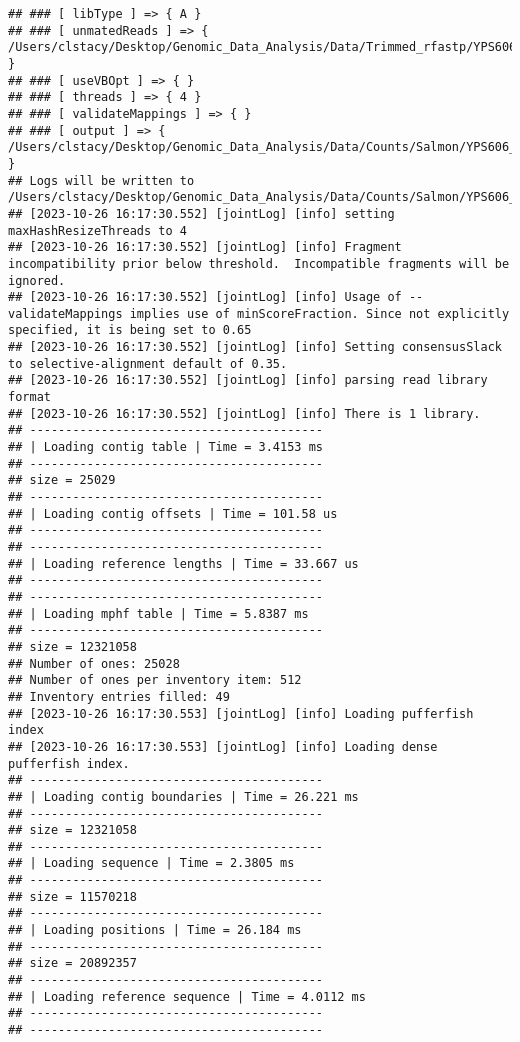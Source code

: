 \documentclass[
]{book}
\begin{document}
\begin{verbatim}
## ### [ libType ] => { A }
## ### [ unmatedReads ] => { /Users/clstacy/Desktop/Genomic_Data_Analysis/Data/Trimmed_rfastp/YPS606_WT_ETOH_REP2_R1.fastq.gz }
## ### [ useVBOpt ] => { }
## ### [ threads ] => { 4 }
## ### [ validateMappings ] => { }
## ### [ output ] => { /Users/clstacy/Desktop/Genomic_Data_Analysis/Data/Counts/Salmon/YPS606_WT_ETOH_REP2_R1.fastq.gz_quant }
## Logs will be written to /Users/clstacy/Desktop/Genomic_Data_Analysis/Data/Counts/Salmon/YPS606_WT_ETOH_REP2_R1.fastq.gz_quant/logs
## [2023-10-26 16:17:30.552] [jointLog] [info] setting maxHashResizeThreads to 4
## [2023-10-26 16:17:30.552] [jointLog] [info] Fragment incompatibility prior below threshold.  Incompatible fragments will be ignored.
## [2023-10-26 16:17:30.552] [jointLog] [info] Usage of --validateMappings implies use of minScoreFraction. Since not explicitly specified, it is being set to 0.65
## [2023-10-26 16:17:30.552] [jointLog] [info] Setting consensusSlack to selective-alignment default of 0.35.
## [2023-10-26 16:17:30.552] [jointLog] [info] parsing read library format
## [2023-10-26 16:17:30.552] [jointLog] [info] There is 1 library.
## -----------------------------------------
## | Loading contig table | Time = 3.4153 ms
## -----------------------------------------
## size = 25029
## -----------------------------------------
## | Loading contig offsets | Time = 101.58 us
## -----------------------------------------
## -----------------------------------------
## | Loading reference lengths | Time = 33.667 us
## -----------------------------------------
## -----------------------------------------
## | Loading mphf table | Time = 5.8387 ms
## -----------------------------------------
## size = 12321058
## Number of ones: 25028
## Number of ones per inventory item: 512
## Inventory entries filled: 49
## [2023-10-26 16:17:30.553] [jointLog] [info] Loading pufferfish index
## [2023-10-26 16:17:30.553] [jointLog] [info] Loading dense pufferfish index.
## -----------------------------------------
## | Loading contig boundaries | Time = 26.221 ms
## -----------------------------------------
## size = 12321058
## -----------------------------------------
## | Loading sequence | Time = 2.3805 ms
## -----------------------------------------
## size = 11570218
## -----------------------------------------
## | Loading positions | Time = 26.184 ms
## -----------------------------------------
## size = 20892357
## -----------------------------------------
## | Loading reference sequence | Time = 4.0112 ms
## -----------------------------------------
## -----------------------------------------

\end{verbatim}
\end{document}
